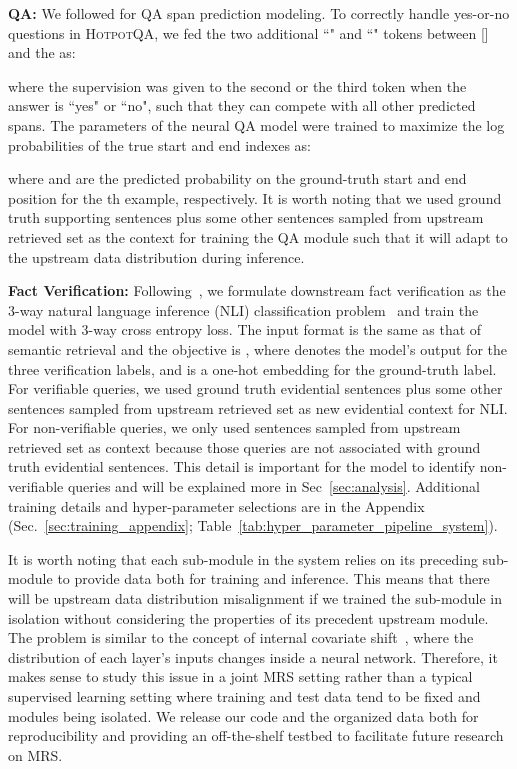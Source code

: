 \documentclass[11pt,a4paper]{article}
\newcommand\hpqa{\textsc{HotpotQA}\xspace}
\begin{document}
\vspace{5pt}\textbf{QA:} We followed  for QA span prediction modeling. To correctly handle yes-or-no questions in \hpqa, we fed the two additional ``" and ``" tokens between [] and the  as:

where the supervision was given to the second or the third token when the answer is ``yes" or ``no", such that they can compete with all other predicted spans.
The parameters of the neural QA model were trained to maximize the log probabilities of the true start and end indexes as:

where  and  are the predicted probability on the ground-truth start and end position for the th example, respectively. It is worth noting that we used ground truth supporting sentences plus some other sentences sampled from upstream retrieved set as the context for training the QA module such that it will adapt to the upstream data distribution during inference.

\vspace{5pt}\textbf{Fact Verification:}
Following~, we formulate downstream fact verification as the 3-way natural language inference (NLI) classification problem~\cite{maccartney2009NLI, snli:emnlp2015} and train the model with 3-way cross entropy loss. The input format is the same as that of semantic retrieval and the objective is , where  denotes the model's output for the three verification labels, and  is a one-hot embedding for the ground-truth label.
For verifiable queries, we used ground truth evidential sentences plus some other sentences sampled from upstream retrieved set as new evidential context for NLI. For non-verifiable queries, we only used sentences sampled from upstream retrieved set as context because those queries are not associated with ground truth evidential sentences. This detail is important for the model to identify non-verifiable queries and will be explained more in Sec~\ref{sec:analysis}.
Additional training details and hyper-parameter selections are in the Appendix (Sec.~\ref{sec:training_appendix}; Table~\ref{tab:hyper_parameter_pipeline_system}).



It is worth noting that each sub-module in the system relies on its preceding sub-module to provide data both for training and inference. This means that there will be upstream data distribution misalignment if we trained the sub-module in isolation without considering the properties of its precedent upstream module. The problem is similar to the concept of internal covariate shift~\cite{ioffe2015batchnorm}, where the distribution of each layer's inputs changes inside a neural network. Therefore, it makes sense to study this issue in a joint MRS setting rather than a typical supervised learning setting where training and test data tend to be fixed and modules being isolated.
We release our code and the organized data both for reproducibility and providing an off-the-shelf testbed to facilitate future research on MRS.
\end{document}
